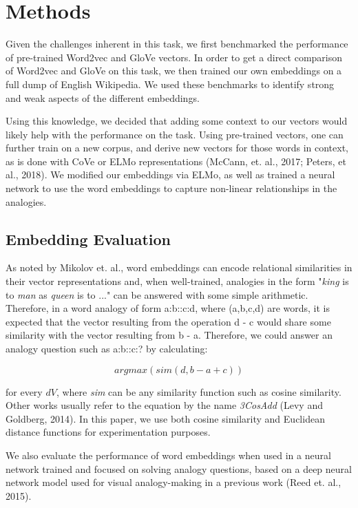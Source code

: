 \documentclass[11pt]{article}
\begin{document}
\section{Methods}

Given the challenges inherent in this task, we first benchmarked the
performance of pre-trained Word2vec and GloVe vectors. In order to get a
direct comparison of Word2vec and GloVe on this task, we then trained
our own embeddings on a full dump of English Wikipedia. We used these
benchmarks to identify strong and weak aspects of the different
embeddings.

Using this knowledge, we decided that adding some context to our vectors would
likely help with the performance on the task. Using pre-trained vectors, one can
further train on a new corpus, and derive new vectors for those words in
context, as is done with CoVe or ELMo representations (McCann, et. al., 2017;
Peters, et al., 2018). We modified our embeddings via ELMo, as well as 
trained a neural network to use the word embeddings to capture non-linear
relationships in the analogies.

\subsection{Embedding Evaluation}

As noted by Mikolov et. al., word embeddings can encode relational similarities
in their vector representations and, when well-trained, analogies in the form
"\emph{king }is to \emph{man }as \emph{queen }is to ..." can be answered with some
simple arithmetic. Therefore, in a word analogy of form a:b::c:d, where
(a,b,c,d) are words, it is expected that the vector resulting from the operation
d - c would share some similarity with the vector resulting from b - a.
Therefore, we could answer an analogy question such as a:b::c:? by calculating:

$$arg max (sim(d,b-a+c))$$

for every $dV$, where \emph{sim }can be any similarity function such as cosine
similarity. Other works usually refer to the equation by the name \emph{3CosAdd}
(Levy and Goldberg, 2014). In this paper, we use both cosine similarity and
Euclidean distance functions for experimentation purposes.

We also evaluate the performance of word embeddings when used in a
neural network trained and focused on solving analogy questions, based
on a deep neural network model used for visual analogy-making in a
previous work (Reed et. al., 2015).
\end{document}
